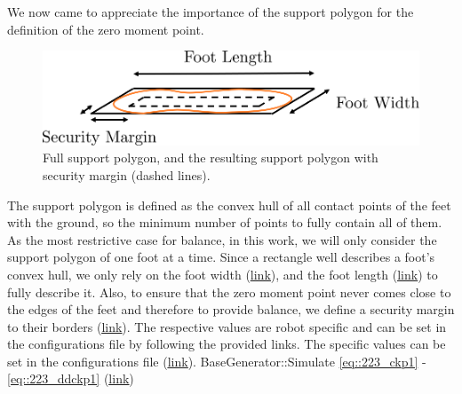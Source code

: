 We now came to appreciate the importance of the support polygon for the definition of the zero moment point. 
\begin{figure}[h!]
	\centering
	\includegraphics[scale=.5]{chapters/02_foundations_for_humanoid_walking/img/support_polygon.png}
	\caption{Full support polygon, and the resulting support polygon with security margin (dashed lines).}
	\label{fig::62_support_polygon}
\end{figure}
The support polygon is defined as the convex hull of all contact points of the feet with the ground, so the minimum number of points to fully contain all of them. As the most restrictive case for balance, in this work, we will only consider the support polygon of one foot at a time. Since a rectangle well describes a foot's convex hull, we only rely on the foot width (\href{https://github.com/mhubii/nmpc_pattern_generator/blob/bc79a6d4f9bcfd3794146355af44429f5b7a9fe0/libs/pattern_generator/configs.yaml#L14}{\underline{link}}), and the foot length (\href{https://github.com/mhubii/nmpc_pattern_generator/blob/bc79a6d4f9bcfd3794146355af44429f5b7a9fe0/libs/pattern_generator/configs.yaml#L15}{\underline{link}}) to fully describe it. Also, to ensure that the zero moment point never comes close to the edges of the feet and therefore to provide balance, we define a security margin to their borders (\href{https://github.com/mhubii/nmpc_pattern_generator/blob/bc79a6d4f9bcfd3794146355af44429f5b7a9fe0/libs/pattern_generator/configs.yaml#L3}{\underline{link}}). The respective values are robot specific and can be set in the configurations file by following the provided links.
The specific values can be set in the configurations file (\href{https://github.com/mhubii/nmpc_pattern_generator/blob/bc79a6d4f9bcfd3794146355af44429f5b7a9fe0/libs/pattern_generator/configs.yaml#L27}{\underline{link}}).
BaseGenerator::Simulate \ref{eq::223_ckp1} - \ref{eq::223_ddckp1}
(\href{https://github.com/mhubii/nmpc_pattern_generator/blob/5a213044c927dc6aac9f7e32ce1e5fb472cd67bb/libs/pattern_generator/src/base_generator.cpp#L887}{\underline{link}})
